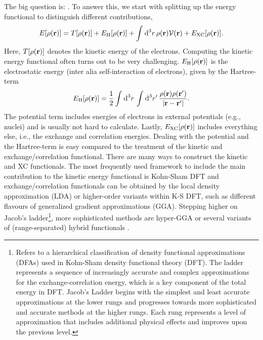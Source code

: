\documentclass[../../main.tex]{subfiles}
\begin{document}
The big question is: . To answer this, we start with splitting up the energy functional to distinguish different contributions,
\begin{align}
	E[\rho(\textbf{r})]=T[\rho(\textbf{r})]+E_{\text{H}}[\rho(\textbf{r})]+\int_{}^{}\text{d}^3r\,\rho(\textbf{r})\mathcal{V}(\textbf{r})+E_{\text{XC}}[\rho(\textbf{r})].
\end{align}
Here, $T[\rho(\textbf{r})]$ denotes the kinetic energy of the electrons. Computing the kinetic energy functional often turns out to be very challenging. $E_{\text{H}}[\rho(\textbf{r})]$ is the electrostatic energy (inter alia self-interaction of electrons), given by the Hartree-term
\begin{align}
	E_{\text{H}}[\rho(\textbf{r})]=\frac 12\int_{}^{}\text{d}^3r\,\int_{}^{}\text{d}^3r'\,\frac{\rho(\textbf{r})\rho(\textbf{r}')}{|\textbf{r}-\textbf{r}'|}.
\end{align}
The potential term includes energies of electrons in external potentials (e.g., nuclei) and is usually not hard to calculate. Lastly, $E_{\text{XC}}[\rho(\textbf{r})]$ includes everything else, i.e., the exchange and correlation energies. Dealing with the potential and the Hartree-term is easy compared to the treatment of the kinetic and exchange/correlation functional. There are many ways to construct the kinetic and XC functionals. The most frequently used framework to include the main contribution to the kinetic energy functional is Kohn-Sham DFT and exchange/correlation functionals can be obtained by the local density approximation (LDA) or higher-order variants within K-S DFT, such as different flavours of generalized gradient approximations (GGA). Stepping higher on Jacob's ladder\footnote{Refers to a hierarchical classification of density functional approximations (DFAs) used in Kohn-Sham density functional theory (DFT). The ladder represents a sequence of increasingly accurate and complex approximations for the exchange-correlation energy, which is a key component of the total energy in DFT. Jacob's Ladder begins with the simplest and least accurate approximations at the lower rungs and progresses towards more sophisticated and accurate methods at the higher rungs. Each rung represents a level of approximation that includes additional physical effects and improves upon the previous level.}, more sophisticated methods are hyper-GGA or several variants of (range-separated) hybrid functionals \cite{Perdew2001}.
\end{document}
